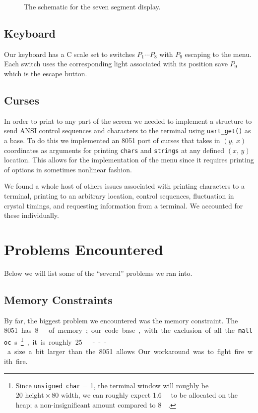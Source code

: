\documentclass[12pt]{article}
\newcommand{\shellcmd}[1]{\texttt{\colorbox{gray!30}{#1}}}
\begin{document}
\begin{figure}[!ht]
    \caption{The schematic for the seven segment display.}
    \label{schematic}
\end{figure}

\subsection{Keyboard}
Our keyboard has a C scale set to switches $P_1 \cdots P_8$ with $P_9$ escaping to the menu. Each switch uses the corresponding light associated with its position save $P_9$ which is the escape button.

\subsection{Curses}
In order to print to any part of the screen we needed to implement a structure to send ANSI control sequences and characters to the terminal using \shellcmd{uart\_get()} as a base. To do this we implemented an \num{8051} port of curses that takes in $(y,\, x)$ coordinates as arguments for printing \shellcmd{chars} and \shellcmd{strings} at any defined $(x,\, y)$ location. This allows for the implementation of the menu since it requires printing of options in sometimes nonlinear fashion.

We found a whole host of others issues associated with printing characters to a terminal, printing to an arbitrary location, control sequences, fluctuation in crystal timings, and requesting information from a terminal. We accounted for these individually.

\section{Problems Encountered}
Below we will list some of the ``several'' problems we ran into.

\subsection{Memory Constraints}
By far, the biggest problem we encountered was the memory constraint. The \SI{8051} has \SI{8}{\kilo\byte} of memory; our code base, with the exclusion of all the \shellcmd{malloc}s\footnote{Since \shellcmd{unsigned char} = \SI{1}{\byte}, the terminal window will roughly be $20\text{ height} \times 80\text{ width} $, we can roughly expect \SI{1.6}{\kilo\byte} to be allocated on the heap; a non-insignificant amount compared to \SI{8}{\kilo\byte}.}, it is roughly \SI{25}{\kilo\byte} --- a size a bit larger than the \num{8051} allows. Our workaround was to fight fire with fire.
\end{document}
